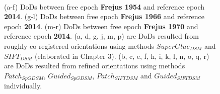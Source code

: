 \begin{figure}[htbp]
\begin{center}
{\begin{minipage}[t]{0.31\linewidth}
			\end{minipage}%
		}
		\\
		
		\caption{{\scriptsize (a-f) \ac{DoD}s between free epoch \textbf{Frejus 1954} and reference epoch \textbf{2014}. (g-l) \ac{DoD}s between free epoch \textbf{Frejus 1966} and reference epoch \textbf{2014}. (m-r) \ac{DoD}s between free epoch \textbf{Frejus 1970} and reference epoch \textbf{2014}. (a, d, g, j, m, p) are \ac{DoD}s resulted from roughly co-registered orientations using methods $SuperGlue_{DSM}$ and $SIFT_{DSM}$ (elaborated in Chapter 3). (b, c, e, f, h, i, k, l, n, o, q, r) are \ac{DoD}s resulted from refined orientations using methods $Patch_{SpGDSM}$, $Guided_{SpGDSM}$, $Patch_{SIFTDSM}$ and $Guided_{SIFTDSM}$ individually.}}
		\label{DoDFrejus}
	\end{center}
\end{figure} 



